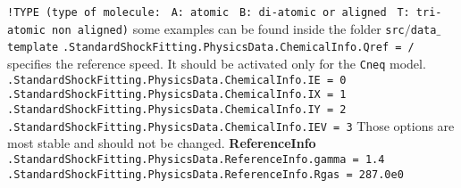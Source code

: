 \documentclass[11pt,a4paper,oneside]{article}
\begin{document}
\newline
\hspace*{1.2cm}
\texttt{!TYPE \hspace*{2cm} (type of molecule:}
\newline
\texttt{\hspace*{6cm} A: atomic}
\newline
\texttt{\hspace*{6cm} B: di-atomic or aligned}
\newline
\texttt{\hspace*{6cm} T: tri-atomic non aligned)}
\newline
\newline
some examples can be found inside the folder \texttt{src$/$data$\_$template}
\newline
\newline
\hspace*{1cm} \texttt{.StandardShockFitting.PhysicsData.ChemicalInfo.Qref = /}
\newline
\newline
specifies the reference speed. It should be activated only for the \texttt{Cneq} model.
\newline
\newline
\hspace*{1cm} \texttt{.StandardShockFitting.PhysicsData.ChemicalInfo.IE = 0}
\newline
\hspace*{1cm} \texttt{.StandardShockFitting.PhysicsData.ChemicalInfo.IX = 1}
\newline
\hspace*{1cm} \texttt{.StandardShockFitting.PhysicsData.ChemicalInfo.IY = 2}
\newline
\hspace*{1cm} \texttt{.StandardShockFitting.PhysicsData.ChemicalInfo.IEV = 3}
\newline
\newline
Those options are most stable and should not be changed.
\newline
\newline
\textbf{ReferenceInfo}
\newline
\newline
\hspace*{1cm} \texttt{.StandardShockFitting.PhysicsData.ReferenceInfo.gamma = 1.4}
\newline
\hspace*{1cm}  \texttt{.StandardShockFitting.PhysicsData.ReferenceInfo.Rgas = 287.0e0}
\newline
\end{document}
